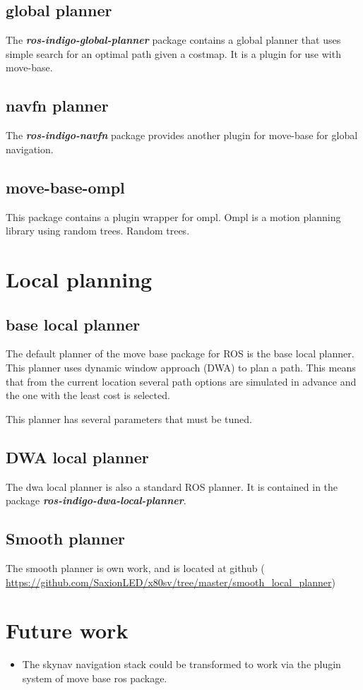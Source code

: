 \documentclass[a4paper]{article}
\newcommand{\rospackage}[1]{\textbf{\textit{#1}}}
\begin{document}
\subsection{global planner}
The \rospackage{ros-indigo-global-planner} package contains a global planner that uses simple search
for an optimal path given a costmap. It is a plugin for use with move-base.

\subsection{navfn planner}
The \rospackage{ros-indigo-navfn} package provides another plugin for move-base for global navigation.

\subsection{move-base-ompl}
This package contains a plugin wrapper for ompl. Ompl is a motion planning library using random trees.
Random trees.

\section{Local planning}

\subsection{base local planner}

The default planner of the move base package for ROS is the base local planner.
This planner uses dynamic window approach (DWA) to plan a path. This means that from the current 
location several path options are simulated in advance and the one with the least cost is selected.

This planner has several parameters that must be tuned.

\subsection{DWA local planner}
The dwa local planner is also a standard ROS planner. It is contained in the package
\rospackage{ros-indigo-dwa-local-planner}.

\subsection{Smooth planner}
The smooth planner is own work, and is located at github (
\url{https://github.com/SaxionLED/x80sv/tree/master/smooth_local_planner})

\section{Future work}

\begin{itemize}
  \item The skynav navigation stack could be transformed to work via the plugin system of move base ros package.
\end{itemize}
\end{document}
